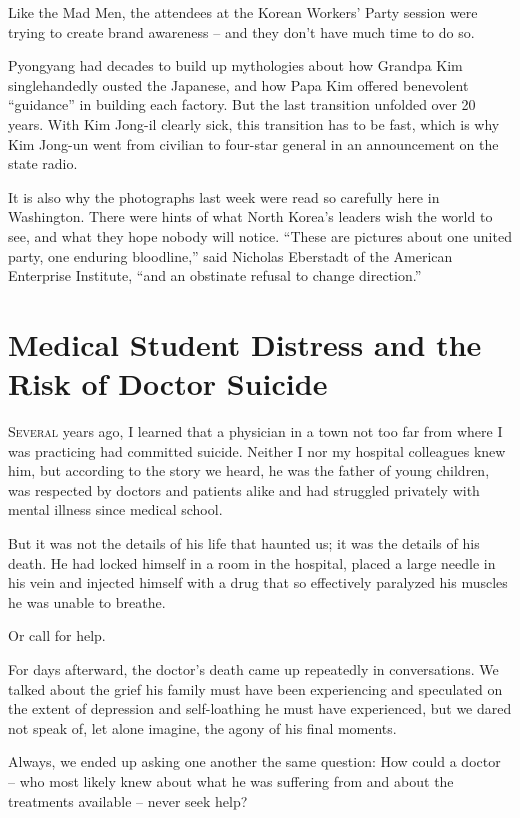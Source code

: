 ﻿\documentclass[12pt]{article}
\begin{document}
Like the Mad Men, the attendees at the Korean Workers' Party session were trying to create brand
awareness -- and they don't have much time to do so.

Pyongyang had decades to build up mythologies about how Grandpa Kim singlehandedly ousted the
Japanese, and how Papa Kim offered benevolent ``guidance'' in building each factory. But the last
transition unfolded over 20 years. With Kim Jong-il clearly sick, this transition has to be fast,
which is why Kim Jong-un went from civilian to four-star general in an announcement on the state
radio.

It is also why the photographs last week were read so carefully here in Washington. There were hints
of what North Korea's leaders wish the world to see, and what they hope nobody will notice. ``These
are pictures about one united party, one enduring bloodline,'' said Nicholas Eberstadt of the
American Enterprise Institute, ``and an obstinate refusal to change direction.''

\section{Medical Student Distress and the Risk of Doctor Suicide}

\lettrine{S}{everal} years ago, I learned that a physician in a town not too
far from where I was practicing had committed suicide. Neither I nor my hospital colleagues knew
him, but according to the story we heard, he was the father of young children, was respected by
doctors and patients alike and had struggled privately with mental illness since medical school.

But it was not the details of his life that haunted us; it was the details of his death. He had
locked himself in a room in the hospital, placed a large needle in his vein and injected himself
with a drug that so effectively paralyzed his muscles he was unable to breathe.

Or call for help.

For days afterward, the doctor's death came up repeatedly in conversations. We talked about the
grief his family must have been experiencing and speculated on the extent of depression and
self-loathing he must have experienced, but we dared not speak of, let alone imagine, the agony of
his final moments.

Always, we ended up asking one another the same question: How could a doctor -- who most likely knew
about what he was suffering from and about the treatments available -- never seek help?
\end{document}
